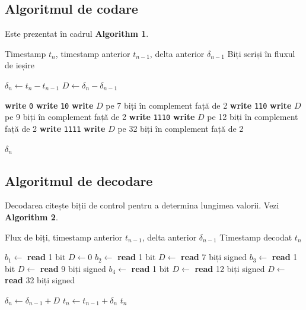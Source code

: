 \subsection{Algoritmul de codare}

Este prezentat în cadrul \textbf{Algorithm 1}.

\begin{algorithm}[h]
\caption{Codare timestamp cu delta-of-delta}
\label{alg:ts-encode}
\begin{algorithmic}[1]
\Require Timestamp $t_n$, timestamp anterior $t_{n-1}$, delta anterior $\delta_{n-1}$
\Ensure Biți scriși în fluxul de ieșire

\State $\delta_n \gets t_n - t_{n-1}$
\State $D \gets \delta_n - \delta_{n-1}$

    \State \textbf{write} \texttt{0} 
    \State \textbf{write} \texttt{10} 
    \State \textbf{write} $D$ pe 7 biți în complement față de 2
    \State \textbf{write} \texttt{110} 
    \State \textbf{write} $D$ pe 9 biți în complement față de 2
    \State \textbf{write} \texttt{1110} 
    \State \textbf{write} $D$ pe 12 biți în complement față de 2
\Else
    \State \textbf{write} \texttt{1111} 
    \State \textbf{write} $D$ pe 32 biți în complement față de 2
\EndIf

\State \Return $\delta_n$ 
\end{algorithmic}
\end{algorithm}

\subsection{Algoritmul de decodare}

Decodarea citește biții de control pentru a determina lungimea valorii. Vezi \textbf{Algorithm 2}.

\begin{algorithm}[h]
\caption{Decodare timestamp}
\label{alg:ts-decode}
\begin{algorithmic}[1]
\Require Flux de biți, timestamp anterior $t_{n-1}$, delta anterior $\delta_{n-1}$
\Ensure Timestamp decodat $t_n$

\State $b_1 \gets$ \textbf{read} 1 bit
    \State $D \gets 0$
\Else
    \State $b_2 \gets$ \textbf{read} 1 bit
        \State $D \gets$ \textbf{read} 7 biți signed
    \Else
        \State $b_3 \gets$ \textbf{read} 1 bit
            \State $D \gets$ \textbf{read} 9 biți signed
        \Else
            \State $b_4 \gets$ \textbf{read} 1 bit
                \State $D \gets$ \textbf{read} 12 biți signed
            \Else
                \State $D \gets$ \textbf{read} 32 biți signed
            \EndIf
        \EndIf
    \EndIf
\EndIf

\State $\delta_n \gets \delta_{n-1} + D$
\State $t_n \gets t_{n-1} + \delta_n$
\State \Return $t_n$
\end{algorithmic}
\end{algorithm}

